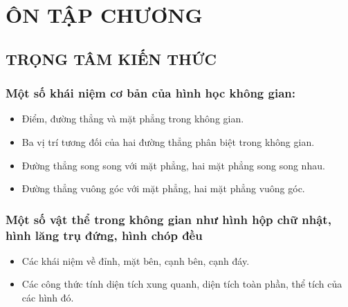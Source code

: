 \section{ÔN TẬP CHƯƠNG}
\subsection{TRỌNG TÂM KIẾN THỨC}
\subsubsection{Một số khái niệm cơ bản của hình học không gian:}
\begin{itemize}
	\item Điểm, đường thẳng và mặt phẳng trong không gian.
	\item Ba vị trí tương đối của hai đường thẳng phân biệt trong không gian.
	\item Đường thẳng song song với mặt phẳng, hai mặt phẳng song song nhau.
	\item Đường thẳng vuông góc với mặt phẳng, hai mặt phẳng vuông góc.
\end{itemize}
\subsubsection{Một số vật thể trong không gian như hình hộp chữ nhật, hình lăng trụ đứng, hình chóp đều}
\begin{itemize}
	\item Các khái niệm về đỉnh, mặt bên, cạnh bên, cạnh đáy.
	\item Các công thức tính diện tích xung quanh, diện tích toàn phần, thể tích của các hình đó.
\end{itemize}
